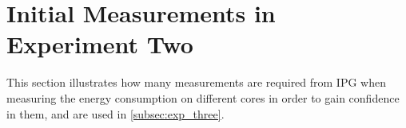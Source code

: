 \section{Initial Measurements in Experiment Two}\label{app:exp_three_coch}

This section illustrates how many measurements are required from IPG when measuring the energy consumption on different cores in order to gain confidence in them, and are used in \cref{subsec:exp_three}.


